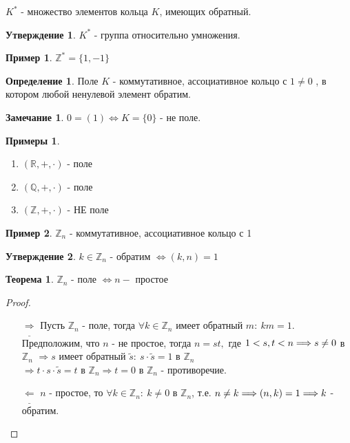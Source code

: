\documentclass[a4paper, 12pt]{article}
\newcommand{\R}{\mathbb R}
\newcommand{\Q}{\mathbb Q}
\newcommand{\Z}{\mathbb Z}
\newcommand\tab[1][.5cm]{\hspace*{#1}}
\theoremstyle{definition}
\newtheorem*{definition}{Определение}
\newtheorem*{theorem}{Теорема}
\newtheorem*{subtheorem}{Утверждение}
\newtheorem*{remark}{Замечание}
\newtheorem*{example}{Примеры}
\newtheorem*{example1}{Пример}
\begin{document}
  $K^*$ - множество элементов кольца $K$, имеющих обратный. 
  \begin{subtheorem}
    $K^*$ - группа относительно умножения. 
  \end{subtheorem}  
  \begin{example1}
    $\Z^* = \{1, -1\}$
  \end{example1}
  \begin{definition}
    Поле $K$ - коммутативное, ассоциативное кольцо с $1 \neq 0$ , в котором любой ненулевой элемент обратим.
  \end{definition} 
  \begin{remark}
    $0 = (1) \Longleftrightarrow K = \{0\}$ - не поле.
  \end{remark} 
  \begin{example}\tab
    \begin{enumerate}
      \item $(\R, +, \cdot)$ - поле
      \item $(\Q, +, \cdot)$ - поле
      \item $(\Z, +, \cdot)$ - НЕ поле   
    \end{enumerate}
  \end{example}
  \begin{example1}
    $\Z_n$ - коммутативное, ассоциативное кольцо с 1
  \end{example1}
  \begin{subtheorem}
    $k \in \Z_n$ - обратим $\Longleftrightarrow (k, n) = 1$  
  \end{subtheorem} 
  \begin{theorem}
    $\Z_n$ - поле $\Longleftrightarrow n - $ простое 
  \end{theorem} 
  \begin{proof}\tab
    \begin{itemize}
      \item[$\underline{\Longrightarrow}$] Пусть $\Z_n$ - поле, тогда $\forall k \in \Z_n$ имеет обратный $m : \ km=1$.\\ Предположим, что $n$ - не простое, тогда $n = st, $ где $1<s, t<n \\ \Longrightarrow s \neq 0$ в $\Z_n$
      $\Longrightarrow s $ имеет обратный $\widetilde{s} : \ s \cdot \widetilde{s} = 1$ в $\Z_n$\\
      $\Longrightarrow t \cdot s \cdot \widetilde{s} = t $ в $
      \Z_n \Longrightarrow t=0$ в $\Z_n$ - противоречие.
      \item[$\underline{\Longleftarrow}$] $n$ - простое, то $\forall k \in \Z_n: \ k \neq 0$ в $\Z_n$, т.е. $n \neq k \Longrightarrow (n, k) = 1 \\ \Longrightarrow k$ - обратим.  
    \end{itemize}
  \end{proof}
\end{document}
